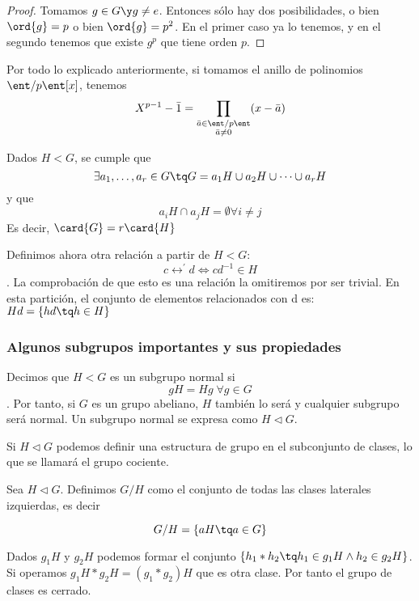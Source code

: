 \documentclass[nochap]{apuntes}
\begin{document}
  \begin{proof}
   Tomamos $g\in G \y g\neq e$. Entonces sólo hay dos posibilidades, o bien $\ord{g}=p$ o bien $\ord{g}=p^{2}$. En el primer caso ya lo tenemos, y en el segundo tenemos que existe $g^p$ que tiene orden $p$.
  \end{proof}
  
  \begin{example}
   Por todo lo explicado anteriormente, si tomamos el anillo de polinomios $\ent/p\ent[x]$, tenemos \[ X^{p-1}-\bar{1}=
   \prod_{\substack{\bar{a}\in\ent/p\ent \\ \bar{a}\neq 0}}(x-\bar{a}) \]
  \end{example}
  
  \begin{theorem}
   Dados $H<G$,  se cumple que \[ \exists a_{1},\dotsc,a_{r}\in G\tq G=a_{1}H \cup a_{2}H \cup \dotsb \cup a_{r}H\] y que \[ a_{i}H\cap a_{j}H=\emptyset \forall i\neq j\] 
   Es decir, $\card{G}=r\card{H}$
  \end{theorem}

  Definimos ahora otra relación a partir de $H<G$: \[ c\rel^{'}d \Leftrightarrow cd^{-1}\in H \]. La comprobación de que esto es una relación
  la omitiremos por ser trivial. En esta partición, el conjunto de elementos relacionados con d es: $Hd=\{hd\tq h\in H\}$

\subsubsection{Algunos subgrupos importantes y sus propiedades}
  \begin{defn}
   Decimos que $H<G$  es un subgrupo normal si \[ gH=Hg \; \forall g \in G \]. Por tanto, si $G$ es un grupo abeliano, $H$ también lo será y cualquier  subgrupo será normal. Un subgrupo normal se expresa como $H\lhd G$.
  \end{defn}
  
  Si $H\lhd G$  podemos definir una estructura de grupo en el subconjunto de clases, lo que se llamará el grupo cociente.
  
  \begin{defn} Sea $H \lhd G$. Definimos $G / H$ como el conjunto de todas las clases laterales izquierdas, es decir
  
  \[ G/H = \{ aH \tq a \in G\} \]
  \end{defn}
  
  
  Dados $g_{1}H$  y $g_{2}H$  podemos formar el conjunto $\{h_{1}\ast h_{2}\tq h_{1}\in g_{1}H \wedge h_{2}\in g_{2}H\}$. Si operamos   $g_{1}H\ast g_{2}H=(g_{1}\ast g_{2})H$  que es otra clase. Por tanto el grupo de clases es cerrado.
  
\end{document}
